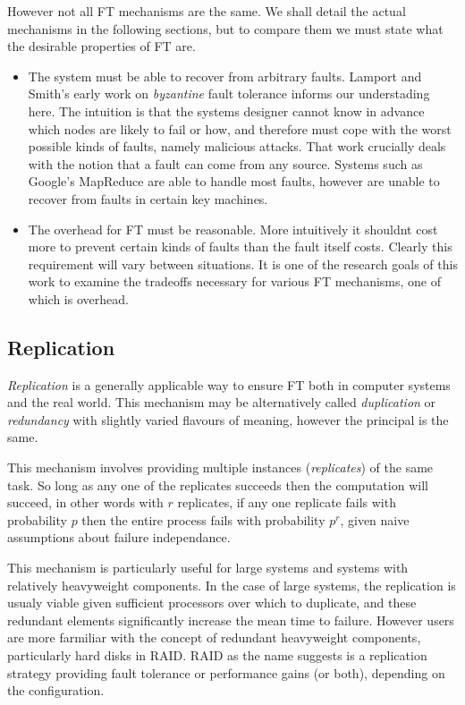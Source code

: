 However not all FT mechanisms are the same.
We shall detail the actual mechanisms in the following sections, but to compare them we must state what the desirable properties of FT are.
\begin{itemize}
	\item	The system must be able to recover from arbitrary faults.
			Lamport and Smith's early work on {\em byzantine} fault tolerance \cite{lam86} informs our understading here.
			The intuition is that the systems designer cannot know in advance which nodes are likely to fail or how, and therefore must cope with the worst possible kinds of faults, namely malicious attacks.
			That work crucially deals with the notion that a fault can come from any source.
			Systems such as Google's MapReduce \cite{dea08} are able to handle most faults, however are unable to recover from faults in certain key machines.
	\item	The overhead for FT must be reasonable.
			More intuitively it shouldnt cost more to prevent certain kinds of faults than the fault itself costs.
			Clearly this requirement will vary between situations.
			It is one of the research goals of this work to examine the tradeoffs necessary for various FT mechanisms, one of which is overhead.
\end{itemize}

\subsection{Replication}
{\em Replication} is a generally applicable way to ensure FT both in computer systems and the real world.
This mechanism may be alternatively called {\em duplication} or {\em redundancy} with slightly varied flavours of meaning, however the principal is the same.

This mechanism involves providing multiple instances ({\em replicates}) of the same task.
So long as any one of the replicates succeeds then the computation will succeed, in other words with $r$ replicates, if any one replicate fails with probability $p$ then the entire process fails with probability $p^r$, given naive assumptions about failure independance.

This mechanism is particularly useful for large systems and systems with relatively heavyweight components.
In the case of large systems, the replication is usualy viable given sufficient processors over which to duplicate, and these redundant elements significantly increase the mean time to failure.
However users are more farmiliar with the concept of redundant heavyweight components, particularly hard disks in RAID.
RAID as the name suggests is a replication strategy providing fault tolerance or performance gains (or both), depending on the configuration.

